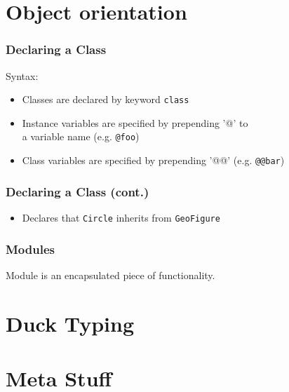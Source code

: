\documentclass{beamer}
\begin{document}
\section{Object orientation}
\begin{frame}
  \frametitle{Declaring a Class}
  \begin{block}{Syntax:}
  \begin{itemize}
    \item Classes are declared by keyword \texttt{class}
    \item Instance variables are specified by prepending '@' to \\ a variable name (e.g. \texttt{@foo})
    \item Class variables are specified by prepending '@@' (e.g. \texttt{@@bar})
  \end{itemize}
  \end{block}
\end{frame}

\begin{frame}[t,fragile]
  \frametitle{Declaring a Class (cont.)}
  \begin{example}
    \begin{semiverbatim}
    \end{semiverbatim}
  \end{example}

  \begin{itemize}
    \item<2> Declares that \texttt{Circle} inherits from \texttt{GeoFigure}
  \end{itemize}
\end{frame}

\begin{frame}
  \frametitle{Modules}
  \begin{definition}[Module]
    Module is an encapsulated piece of functionality.
  \end{definition}
\end{frame}

\section{Duck Typing}
\begin{frame}
\end{frame}

\section{Meta Stuff}
\begin{frame}
\end{frame}
\end{document}
